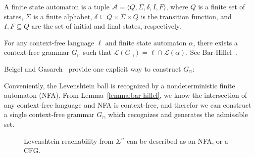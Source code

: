 \documentclass[runningheads]{llncs}
\begin{document}
\begin{definition}
A finite state automaton is a tuple $\mathcal{A} = \langle Q, \Sigma, \delta, I, F\rangle$, where $Q$ is a finite set of states, $\Sigma$ is a finite alphabet, $\delta \subseteq Q \times \Sigma \times Q$ is the transition function, and $I, F \subseteq Q$ are the set of initial and final states, respectively.
\end{definition}

\begin{lemma}\label{lemma:bar-hillel}
For any context-free language $\ell$ and finite state automaton $\alpha$, there exists a context-free grammar $G_\cap$ such that $\mathcal{L}(G_\cap) = \ell \cap \mathcal{L}(\alpha)$. See Bar-Hillel~\cite{bar1961formal}.
\end{lemma}

\pagebreak \noindent Beigel and Gasarch~\cite{beigelproof} provide one explicit way to construct $G_\cap$:


Conveniently, the Levenshtein ball is recognized by a nondeterministic finite automaton (NFA). From Lemma~\ref{lemma:bar-hillel}, we know the intersection of any context-free language and NFA is context-free, and therefor we can construct a single context-free grammar $G_\cap$ which recognizes and generates the admissible set.

\begin{figure}[H]
  \begin{center}
  \resizebox{.9\textwidth}{!}{}
  \end{center}
  \caption{Levenshtein reachability from $\Sigma^n$ can be described as an NFA, or a CFG.}
\end{figure}
\end{document}
